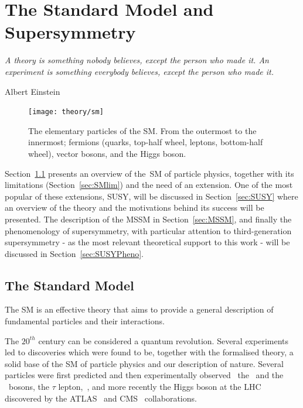 \chapter{The Standard Model and Supersymmetry}
\label{ch:theory} 
\epigraph{\emph{A theory is something nobody believes, except the person who made it. An experiment is something everybody believes, except the person who made it.}} {Albert Einstein}

	\begin{figure}
		\centering
			\texttt{[image: theory/sm]}
		\caption{\label{fig:sm_el_part} The elementary particles of the \ac{SM}. From the outermost to the innermost; fermions (quarks, top-half wheel, leptons, bottom-half wheel), vector bosons, and the Higgs boson.}
	\end{figure}				

	Section~\ref{sec:SMov} presents an overview of the~\ac{SM} of particle physics, together with its limitations (Section~\ref{sec:SMlim}) and the need of an extension. One of the most popular of these extensions, \ac{SUSY}, will be discussed in Section~\ref{sec:SUSY} where an overview of the theory and the motivations behind its success will be presented. The description of the \ac{MSSM} in Section~\ref{sec:MSSM}, and finally the phenomenology of supersymmetry, with particular attention to third-generation supersymmetry - as the most relevant theoretical support to this work - will be discussed in Section~\ref{sec:SUSYPheno}.


	\section{The Standard Model}
	\label{sec:SMov}

		The \ac{SM} is an effective theory that aims to provide a general description of fundamental particles and their interactions. %

		The $20^{th}$ century can be considered a quantum revolution. Several experiments led to discoveries which were found to be, together with the formalised theory, a solid base of the \ac{SM} of particle physics and our description of nature. Several particles were first predicted and then experimentally observed \eg\ the \Wboson\ and the \Zboson\ bosons, the $\tau$ lepton,~\cite{Herrero1998}, and more recently the Higgs boson at the \ac{LHC} discovered by the \acs{ATLAS}~\cite{ATLASHiggs2012} and \acs{CMS}~\cite{CMSHiggs2012} collaborations.

